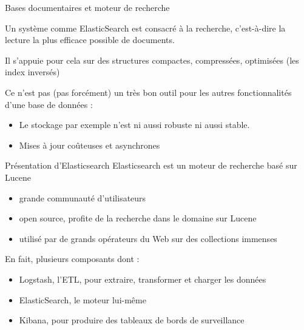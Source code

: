 \begin{frame}{Bases documentaires et moteur de recherche}

Un système comme ElasticSearch est consacré à la \alert{recherche},
    c'est-à-dire la lecture la plus efficace possible de documents.

\vfill

Il s'appuie pour cela sur des structures compactes, compressées,
    optimisées (les \alert{index inversés}) 

\vfill

Ce n'est pas (pas forcément) un très bon outil pour les autres fonctionnalités
    d'une base de données :
    \begin{itemize}
      \item Le stockage par exemple n'est ni aussi robuste ni aussi stable.
      \item Mises à jour coûteuses et asynchrones
    \end{itemize}

\end{frame} %

\begin{frame}{Présentation d'Elasticsearch}
  Elasticsearch est un moteur de recherche basé sur Lucene
  \begin{itemize}
    \item grande communauté d'utilisateurs
    \item open source, profite de la recherche dans le domaine sur Lucene
    \item utilisé par de grands opérateurs du Web sur des collections immenses
  \end{itemize}
  \medskip
  En fait, plusieurs composants dont :
  \begin{itemize}
    \item Logstash, l'ETL, pour extraire, transformer et charger les données
    \item ElasticSearch, le moteur lui-même
    \item Kibana, pour produire des tableaux de bords de surveillance
  \end{itemize}
\end{frame}

